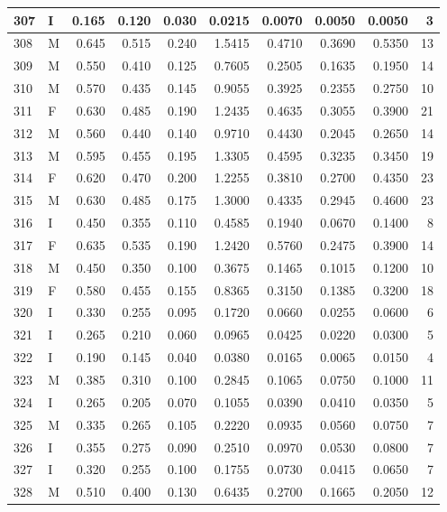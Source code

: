 \documentclass[9pt,twocolumn,twoside,]{pnas-new}
\begin{document}
\begin{tabular}{l|l|r|r|r|r|r|r|r|r}
\hline
307 & I & 0.165 & 0.120 & 0.030 & 0.0215 & 0.0070 & 0.0050 & 0.0050 & 3\\
\hline
308 & M & 0.645 & 0.515 & 0.240 & 1.5415 & 0.4710 & 0.3690 & 0.5350 & 13\\
\hline
309 & M & 0.550 & 0.410 & 0.125 & 0.7605 & 0.2505 & 0.1635 & 0.1950 & 14\\
\hline
310 & M & 0.570 & 0.435 & 0.145 & 0.9055 & 0.3925 & 0.2355 & 0.2750 & 10\\
\hline
311 & F & 0.630 & 0.485 & 0.190 & 1.2435 & 0.4635 & 0.3055 & 0.3900 & 21\\
\hline
312 & M & 0.560 & 0.440 & 0.140 & 0.9710 & 0.4430 & 0.2045 & 0.2650 & 14\\
\hline
313 & M & 0.595 & 0.455 & 0.195 & 1.3305 & 0.4595 & 0.3235 & 0.3450 & 19\\
\hline
314 & F & 0.620 & 0.470 & 0.200 & 1.2255 & 0.3810 & 0.2700 & 0.4350 & 23\\
\hline
315 & M & 0.630 & 0.485 & 0.175 & 1.3000 & 0.4335 & 0.2945 & 0.4600 & 23\\
\hline
316 & I & 0.450 & 0.355 & 0.110 & 0.4585 & 0.1940 & 0.0670 & 0.1400 & 8\\
\hline
317 & F & 0.635 & 0.535 & 0.190 & 1.2420 & 0.5760 & 0.2475 & 0.3900 & 14\\
\hline
318 & M & 0.450 & 0.350 & 0.100 & 0.3675 & 0.1465 & 0.1015 & 0.1200 & 10\\
\hline
319 & F & 0.580 & 0.455 & 0.155 & 0.8365 & 0.3150 & 0.1385 & 0.3200 & 18\\
\hline
320 & I & 0.330 & 0.255 & 0.095 & 0.1720 & 0.0660 & 0.0255 & 0.0600 & 6\\
\hline
321 & I & 0.265 & 0.210 & 0.060 & 0.0965 & 0.0425 & 0.0220 & 0.0300 & 5\\
\hline
322 & I & 0.190 & 0.145 & 0.040 & 0.0380 & 0.0165 & 0.0065 & 0.0150 & 4\\
\hline
323 & M & 0.385 & 0.310 & 0.100 & 0.2845 & 0.1065 & 0.0750 & 0.1000 & 11\\
\hline
324 & I & 0.265 & 0.205 & 0.070 & 0.1055 & 0.0390 & 0.0410 & 0.0350 & 5\\
\hline
325 & M & 0.335 & 0.265 & 0.105 & 0.2220 & 0.0935 & 0.0560 & 0.0750 & 7\\
\hline
326 & I & 0.355 & 0.275 & 0.090 & 0.2510 & 0.0970 & 0.0530 & 0.0800 & 7\\
\hline
327 & I & 0.320 & 0.255 & 0.100 & 0.1755 & 0.0730 & 0.0415 & 0.0650 & 7\\
\hline
328 & M & 0.510 & 0.400 & 0.130 & 0.6435 & 0.2700 & 0.1665 & 0.2050 & 12\\

\end{tabular}
\end{document}
